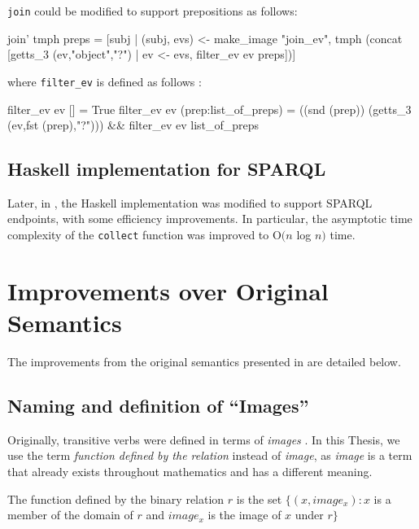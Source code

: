\documentclass[../main.tex]{subfiles}
\begin{document}
\texttt{join} could be modified to support prepositions as
follows:

\begin{code}
  join’ tmph preps = [subj | (subj, evs) <- make_image "join_ev", 
    tmph (concat [getts_3 (ev,"object","?") | ev <- evs,
      filter_ev ev preps])]
\end{code}

where \texttt{filter\_ev} is defined as follows \cite{frost2014denotational}:

\begin{code}
  filter_ev ev [] = True
  filter_ev ev (prep:list_of_preps) = ((snd (prep)) (getts_3 (ev,fst (prep),"?")))
                                      && filter_ev ev list_of_preps
\end{code}

\subsection{Haskell implementation for SPARQL}

Later, in \cite{agboola2015extensible}, the Haskell implementation was modified
to support SPARQL endpoints, with some efficiency improvements.  In particular, the asymptotic time complexity of the \texttt{collect} function was improved to O$(n$ log $n)$ time.

\section{Improvements over Original Semantics}

The improvements from the original semantics presented in \cite{frost2014demonstration} \cite{frostagboola2014} are detailed below.

\subsection{Naming and definition of ``Images''}

Originally, transitive verbs were defined in terms of {\em images} \cite{frost2014denotational}.
In this Thesis, we use the term {\em function defined by the relation} instead of {\em image}, as {\em image} is a term that already exists throughout mathematics and has
a different meaning.

\begin{definition}
	The function defined by the binary relation $r$ is the set $\{(x, image_x) : x $ is a member of the domain of $r$ and $image_x$ is the image of $x$ under $r\}$
\end{definition}
\end{document}
